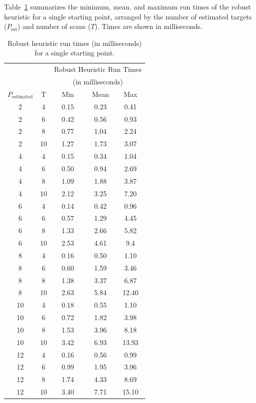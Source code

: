  Table~\ref{tab:Robust_heuristic_times} summarizes the minimum, mean, and maximum run times of the robust heuristic for a single starting point, arranged by the number of estimated targets ($P_{\text{est}}$) and number of scans ($T$). Times are shown in milliseconds. 
\begin{table}[h]
\centering
\begin{tabular}{cc|ccc}
  \hline
   & & \multicolumn{3}{c}{Robust Heuristic Run Times} \\
   & & \multicolumn{3}{c}{(in milliseconds)}\\
   $ P_{\text{estimated}}$ & T & $\;\;$Min$\;\;$ & Mean & Max \\ 
  \hline
  \hline
  2 & 4 & 0.15 & 0.23 & 0.41 \\ 
  2 & 6 & 0.42 & 0.56 & 0.93 \\ 
  2 & 8 & 0.77 & 1.04 & 2.24 \\ 
  2 & 10 & 1.27 & 1.73 & 3.07 \\ 
  4 & 4 & 0.15 & 0.34 & 1.04 \\ 
  4 & 6 & 0.50 & 0.94 & 2.69 \\ 
  4 & 8 & 1.09 & 1.88 & 3.87 \\ 
  4 & 10 & 2.12 & 3.25 & 7.20 \\ 
  6 & 4 & 0.14 & 0.42 & 0.96 \\ 
  6 & 6 & 0.57 & 1.29 & 4.45 \\ 
  6 & 8 & 1.33 & 2.66 & 5.82 \\ 
  6 & 10 & 2.53 & 4.61 & 9.4 \\ 
  8 & 4 & 0.16 & 0.50 & 1.10 \\ 
  8 & 6 & 0.60 & 1.59 & 3.46 \\ 
  8 & 8 & 1.38 & 3.37 & 6.87 \\ 
  8 & 10 & 2.63 & 5.84 & 12.40 \\ 
  10 & 4 & 0.18 & 0.55 & 1.10 \\ 
  10 & 6 & 0.72 & 1.82 & 3.98 \\ 
  10 & 8 & 1.53 & 3.96 & 8.18 \\ 
  10 & 10 & 3.42 & 6.93 & 13.93 \\ 
  12 & 4 & 0.16 & 0.56 & 0.99 \\ 
  12 & 6 & 0.99 & 1.95 & 3.96 \\ 
  12 & 8 & 1.74 & 4.33 & 8.69 \\ 
  12 & 10 & 3.40 & 7.71 & 15.10 \\ 
   \hline
\end{tabular}
\caption{Robust heuristic run times (in milliseconds) for a single starting point.}
\label{tab:Robust_heuristic_times}
\end{table}

